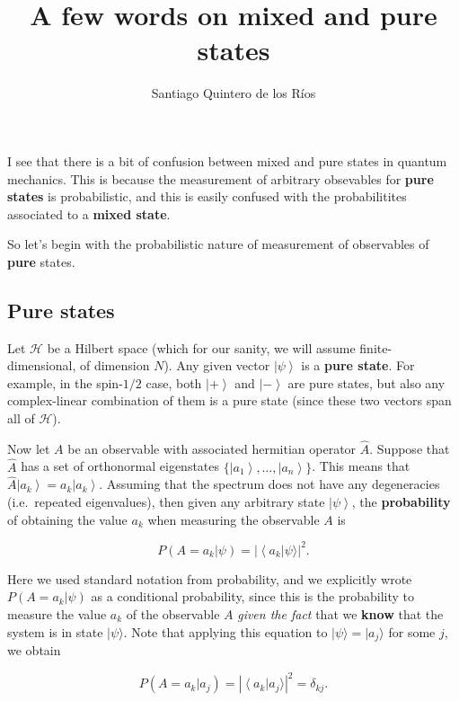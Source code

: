 \documentclass[a4]{article}
\title{A few words on mixed and pure states}
\author{Santiago Quintero de los Ríos}
\date{\the\year}
\begin{document}
\maketitle

I see that there is a bit of confusion between mixed and pure states in
quantum mechanics. This is because the measurement of arbitrary
obsevables for \textbf{pure states} is probabilistic, and this is easily
confused with the probabilitites associated to a \textbf{mixed state}.

So let's begin with the probabilistic nature of measurement of
observables of \textbf{pure} states.

\subsection{Pure states}\label{pure-states}

Let $\mathcal{H}$ be a Hilbert space (which for our sanity, we will
assume finite-dimensional, of dimension $N$). Any given vector
$\left|\psi\right\rangle$ is a \textbf{pure state}. For example, in
the spin-$1/2$ case, both $\left|+\right\rangle$ and
$\left|-\right\rangle$ are pure states, but also any complex-linear
combination of them is a pure state (since these two vectors span all of
$\mathcal{H}$).

Now let $A$ be an observable with associated hermitian operator
$\hat{A}$. Suppose that $\hat{A}$ has a set of orthonormal
eigenstates $\{\left|a_1\right\rangle,\dots,\left|a_n\right\rangle\}$.
This means that
$\hat{A}\left|a_k\right\rangle = a_k\left|a_k\right\rangle$. Assuming
that the spectrum does not have any degeneracies (i.e.~repeated
eigenvalues), then given any arbitrary state
$\left|\psi\right\rangle$, the \textbf{probability} of obtaining the
value $a_k$ when measuring the observable $A$ is

\begin{equation*}P(A=a_k|\psi) = \left|\left\langle a_k\right|\psi\rangle\right|^2.\end{equation*}

Here we used standard notation from probability, and we explicitly wrote
$P(A=a_k|\psi)$ as a conditional probability, since this is the
probability to measure the value $a_k$ of the observable $A$
\emph{given the fact} that we \textbf{know} that the system is in state
$|\psi\rangle$. Note that applying this equation to
$|\psi\rangle = |a_j\rangle$ for some $j$, we obtain

\begin{equation*} P(A=a_k|a_j) = \left|\left\langle a_k\right|a_j\rangle\right|^2 = \delta_{kj}.\end{equation*}
\end{document}
